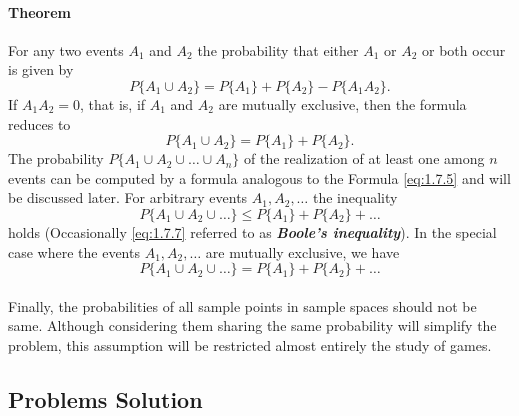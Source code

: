 \documentclass{article}
\numberwithin{equation}{subsection}
\begin{document}
			\paragraph{Theorem} For any two events $A_1$ and $A_2$ the probability that either $A_1$ or $A_2$ or both occur is given by 
			\begin{equation}
				\label{eq:1.7.5}
				P\{A_1\cup A_2\} = P\{A_1\}+P\{A_2\}-P\{A_1A_2\}. 
			\end{equation}
			If $A_1A_2 = 0$, that is, if $A_1$ and $A_2$ are mutually exclusive, then the formula reduces to 			
			\begin{equation}
				\label{eq:1.7.6}
				P\{A_1\cup A_2\} = P\{A_1\}+P\{A_2\}.
			\end{equation}			
			The probability $P\{A_1\cup A_2\cup \dots \cup A_n\}$ of the realization of at least one among $n$ events can be computed by a formula analogous to the Formula \eqref{eq:1.7.5} and will be discussed later. For arbitrary events $A_1,A_2,\dots$ the inequality
			\begin{equation}
				\label{eq:1.7.7}
				P\{A_1\cup A_2\cup \dots\} \leq P\{A_1\} + P\{A_2\} + \dots
			\end{equation}
			holds (Occasionally \eqref{eq:1.7.7} referred to as \textit{\textbf{Boole's inequality}}). In the special case where the events $A_1,A_2,\dots$ are mutually exclusive, we have 
			\begin{equation}
				\label{eq:1.7.8}
				P\{A_1\cup A_2\cup \dots\} = P\{A_1\} + P\{A_2\} + \dots
			\end{equation}
			\paragraph{} Finally, the probabilities of all sample points in sample spaces should not be same. Although considering them sharing the same probability will simplify the problem, this assumption will be restricted almost entirely the study of games.
		\subsection{Problems Solution}
\end{document}
